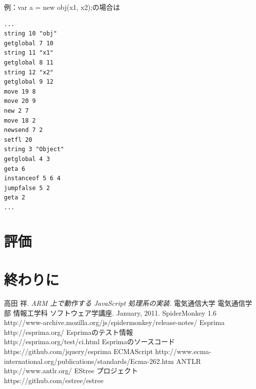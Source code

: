 \documentclass[12pt]{article}
\begin{document}
例：var a = new obj(x1, x2);の場合は\\

\begin{lstlisting}
...
string 10 "obj"
getglobal 7 10
string 11 "x1"
getglobal 8 11
string 12 "x2"
getglobal 9 12
move 19 8
move 20 9
new 2 7
move 18 2
newsend 7 2
setfl 20
string 3 "Object"
getglobal 4 3
geta 6
instanceof 5 6 4
jumpfalse 5 2
geta 2
...
\end{lstlisting}

\section{評価}

\section{終わりに}

\newpage
\begin{thebibliography}{9}
高田 祥. \textit{ARM 上で動作する JavaScript 処理系の実装}. 電気通信大学 電気通信学部
情報工学科 ソフトウェア学講座. January, 2011.
SpiderMonkey 1.6 \newline
http://www-archive.mozilla.org/js/spidermonkey/release-notes/
Esprima \newline
http://esprima.org/
Esprimaのテスト情報 \\
http://esprima.org/test/ci.html
Esprimaのソースコード \\
https://github.com/jquery/esprima
ECMAScript \newline
http://www.ecma-international.org/publications/standards/Ecma-262.htm
ANTLR \newline
http://www.antlr.org/
EStree プロジェクト \\
https://github.com/estree/estree
\end{thebibliography}
\end{document}
